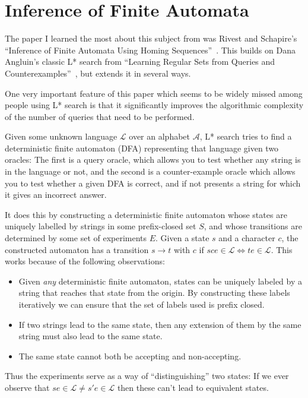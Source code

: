 \documentclass[a4paper]{book}
\begin{document}
\section{Inference of Finite Automata}\label{sec:langinference}

The paper I learned the most about this subject from was Rivest and Schapire's ``Inference of Finite Automata Using Homing Sequences''~\cite{DBLP:journals/iandc/RivestS93}.
This builds on Dana Angluin's classic L* search from ``Learning Regular Sets from Queries and Counterexamples''~\cite{DBLP:journals/iandc/Angluin87},
but extends it in several ways.

One very important feature of this paper which seems to be widely missed among people using L* search is that it significantly improves the algorithmic complexity of the number of queries that need to be performed.

Given some unknown language \(\mathcal{L}\) over an alphabet \(\mathcal{A}\),
L* search tries to find a deterministic finite automaton (DFA) representing that language given two oracles:
The first is a query oracle,
which allows you to test whether any string is in the language or not,
and the second is a counter-example oracle which allows you to test whether a given DFA is correct,
and if not presents a string for which it gives an incorrect answer.

It does this by constructing a deterministic finite automaton whose states are uniquely labelled by strings in some prefix-closed set \(S\),
and whose transitions are determined by some set of experiments \(E\).
Given a state \(s\) and a character \(c\),
the constructed automaton has a transition \(s \to t\) with \(c\) if \(sce \in \mathcal{L} \iff te \in \mathcal{L}\).
This works because of the following observations:

\begin{itemize}
\item Given \emph{any} deterministic finite automaton,
states can be uniquely labeled by a string that reaches that state from the origin.
By constructing these labels iteratively we can ensure that the set of labels used is prefix closed.
\item If two strings lead to the same state,
then any extension of them by the same string must also lead to the same state.
\item The same state cannot both be accepting and non-accepting.
\end{itemize}

Thus the experiments serve as a way of ``distinguishing'' two states:
If we ever observe that \(se \in \mathcal{L} \neq s'e \in \mathcal{L}\) then these can't lead to equivalent states.
\end{document}
